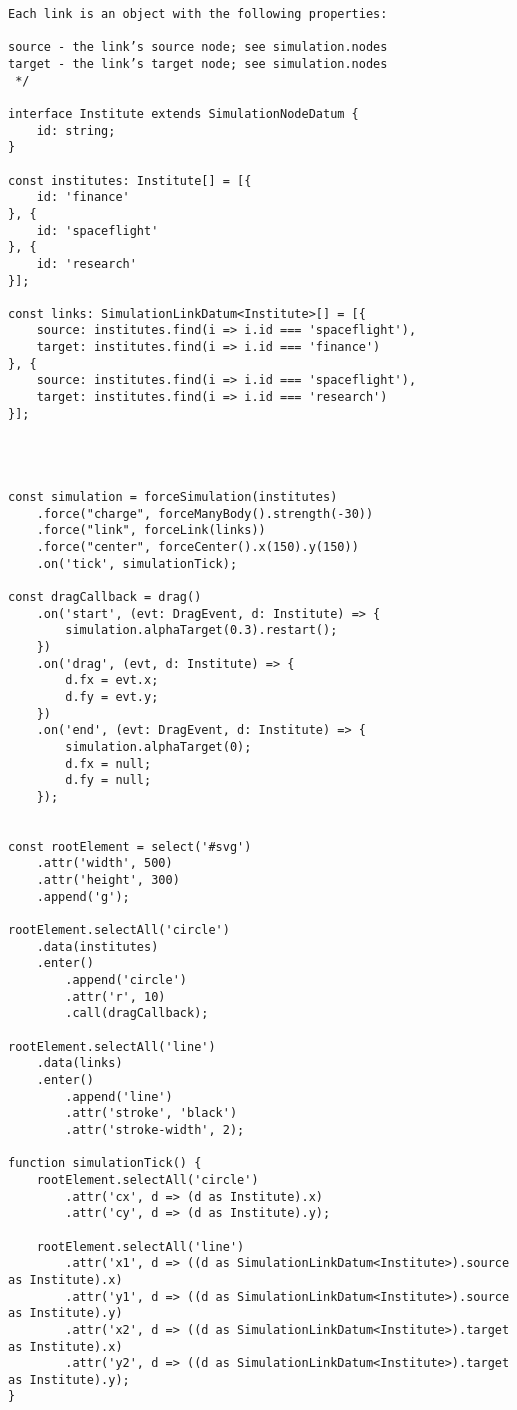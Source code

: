 {\begin{lstlisting}
Each link is an object with the following properties:

source - the link’s source node; see simulation.nodes
target - the link’s target node; see simulation.nodes
 */

interface Institute extends SimulationNodeDatum {
    id: string;
}

const institutes: Institute[] = [{
    id: 'finance'
}, {
    id: 'spaceflight'
}, {
    id: 'research'
}];

const links: SimulationLinkDatum<Institute>[] = [{
    source: institutes.find(i => i.id === 'spaceflight'),
    target: institutes.find(i => i.id === 'finance')
}, {
    source: institutes.find(i => i.id === 'spaceflight'),
    target: institutes.find(i => i.id === 'research')
}];




const simulation = forceSimulation(institutes)
    .force("charge", forceManyBody().strength(-30))
    .force("link", forceLink(links))
    .force("center", forceCenter().x(150).y(150))
    .on('tick', simulationTick);

const dragCallback = drag()
    .on('start', (evt: DragEvent, d: Institute) => {
        simulation.alphaTarget(0.3).restart(); 
    })
    .on('drag', (evt, d: Institute) => {
        d.fx = evt.x;
        d.fy = evt.y;
    })
    .on('end', (evt: DragEvent, d: Institute) => {
        simulation.alphaTarget(0);
        d.fx = null;
        d.fy = null;
    });


const rootElement = select('#svg')
    .attr('width', 500)
    .attr('height', 300)
    .append('g');

rootElement.selectAll('circle')
    .data(institutes)
    .enter()
        .append('circle')
        .attr('r', 10)
        .call(dragCallback);

rootElement.selectAll('line')
    .data(links)
    .enter()
        .append('line')
        .attr('stroke', 'black')
        .attr('stroke-width', 2);

function simulationTick() {
    rootElement.selectAll('circle')
        .attr('cx', d => (d as Institute).x)
        .attr('cy', d => (d as Institute).y);

    rootElement.selectAll('line')
        .attr('x1', d => ((d as SimulationLinkDatum<Institute>).source as Institute).x)
        .attr('y1', d => ((d as SimulationLinkDatum<Institute>).source as Institute).y)
        .attr('x2', d => ((d as SimulationLinkDatum<Institute>).target as Institute).x)
        .attr('y2', d => ((d as SimulationLinkDatum<Institute>).target as Institute).y);
}
\end{lstlisting}

}
